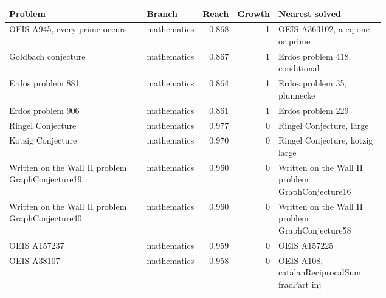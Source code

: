 \begin{tabular}{@{}p{0.42\linewidth}lrrp{0.3\linewidth}@{}}
\toprule
Problem & Branch & Reach & Growth & Nearest solved \\
\midrule
OEIS A945, every prime occurs & mathematics & 0.868 & 1 & OEIS A363102, a eq one or prime \\
Goldbach conjecture & mathematics & 0.867 & 1 & Erdos problem 418, conditional \\
Erdos problem 881 & mathematics & 0.864 & 1 & Erdos problem 35, plunnecke \\
Erdos problem 906 & mathematics & 0.861 & 1 & Erdos problem 229 \\
Ringel Conjecture & mathematics & 0.977 & 0 & Ringel Conjecture, large \\
Kotzig Conjecture & mathematics & 0.970 & 0 & Ringel Conjecture, kotzig large \\
Written on the Wall II problem GraphConjecture19 & mathematics & 0.960 & 0 & Written on the Wall II problem GraphConjecture16 \\
Written on the Wall II problem GraphConjecture40 & mathematics & 0.960 & 0 & Written on the Wall II problem GraphConjecture58 \\
OEIS A157237 & mathematics & 0.959 & 0 & OEIS A157225 \\
OEIS A38107 & mathematics & 0.958 & 0 & OEIS A108, catalanReciprocalSum fracPart inj \\
\bottomrule
\end{tabular}
